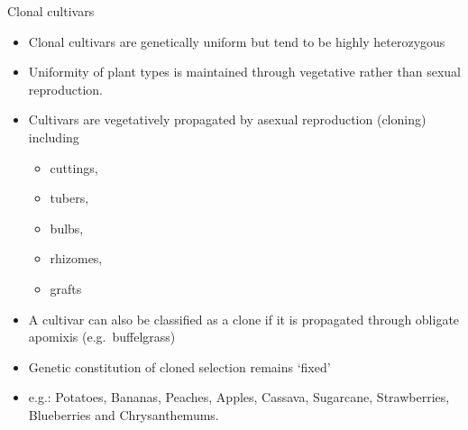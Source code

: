 \documentclass[11pt,ignorenonframetext,aspectratio=169]{beamer}
\providecommand{\tightlist}{%
  \setlength{\itemsep}{0pt}\setlength{\parskip}{0pt}}
\begin{document}
\begin{frame}{Clonal cultivars}
\protect\hypertarget{clonal-cultivars}{}
\begin{itemize}
\tightlist
\item
  Clonal cultivars are genetically uniform but tend to be highly
  heterozygous
\item
  Uniformity of plant types is maintained through vegetative rather than
  sexual reproduction.
\item
  Cultivars are vegetatively propagated by asexual reproduction
  (cloning) including

  \begin{itemize}
  \tightlist
  \item
    cuttings,
  \item
    tubers,
  \item
    bulbs,
  \item
    rhizomes,
  \item
    grafts
  \end{itemize}
\item
  A cultivar can also be classified as a clone if it is propagated
  through obligate apomixis (e.g.~buffelgrass)
\item
  Genetic constitution of cloned selection remains `fixed'
\item
  e.g.: Potatoes, Bananas, Peaches, Apples, Cassava, Sugarcane,
  Strawberries, Blueberries and Chrysanthemums.
\end{itemize}
\end{frame}
\end{document}

